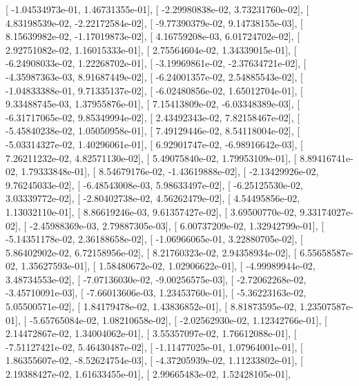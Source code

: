 \documentclass{article}
\begin{document}
       [ -1.04534973e-01,   1.46731355e-01],
       [ -2.29980838e-02,   3.73231760e-02],
       [  4.83198539e-02,  -2.22172584e-02],
       [ -9.77390379e-02,   9.14738155e-03],
       [  8.15639982e-02,  -1.17019873e-02],
       [  4.16759208e-03,   6.01724702e-02],
       [  2.92751082e-02,   1.16015333e-01],
       [  2.75564604e-02,   1.34339015e-01],
       [ -6.24908033e-02,   1.22268702e-01],
       [ -3.19969861e-02,  -2.37634721e-02],
       [ -4.35987363e-03,   8.91687449e-02],
       [ -6.24001357e-02,   2.54885543e-02],
       [ -1.04833388e-01,   9.71335137e-02],
       [ -6.02480856e-02,   1.65012704e-01],
       [  9.33488745e-03,   1.37955876e-01],
       [  7.15413809e-02,  -6.03348389e-03],
       [ -6.31717065e-02,   9.85349994e-02],
       [  2.43492343e-02,   7.82158467e-02],
       [ -5.45840238e-02,   1.05050958e-01],
       [  7.49129446e-02,   8.54118004e-02],
       [ -5.03314327e-02,   1.40296061e-01],
       [  6.92901747e-02,  -6.98916642e-03],
       [  7.26211232e-02,   4.82571130e-02],
       [  5.49075840e-02,   1.79953109e-01],
       [  8.89416741e-02,   1.79333848e-01],
       [  8.54679176e-02,  -1.43619888e-02],
       [ -2.13429926e-02,   9.76245033e-02],
       [ -6.48543008e-03,   5.98633497e-02],
       [ -6.25125530e-02,   3.03339772e-02],
       [ -2.80402738e-02,   4.56262479e-02],
       [  4.54495856e-02,   1.13032110e-01],
       [  8.86619246e-03,   9.61357427e-02],
       [  3.69500770e-02,   9.33174027e-02],
       [ -2.45988369e-03,   2.79887305e-03],
       [  6.00737209e-02,   1.32942799e-01],
       [ -5.14351178e-02,   2.36188658e-02],
       [ -1.06966065e-01,   3.22880705e-02],
       [  5.86402902e-02,   6.72158956e-02],
       [  8.21760323e-02,   2.94358934e-02],
       [  6.55658587e-02,   1.35627593e-01],
       [  1.58480672e-02,   1.02906622e-01],
       [ -4.99989944e-02,   3.48734553e-02],
       [ -7.07136030e-02,  -9.00256575e-03],
       [ -2.72062268e-02,  -3.45710091e-03],
       [ -7.66013606e-03,   1.23453760e-01],
       [ -5.36223163e-02,   5.05500571e-02],
       [  1.84179478e-02,   1.43836852e-01],
       [  8.81873595e-02,   1.23507587e-01],
       [ -5.65765084e-02,   1.08210658e-02],
       [ -2.02562930e-02,   1.12342766e-01],
       [  2.14472867e-02,   1.34004062e-01],
       [  3.55357097e-02,   1.76612088e-01],
       [ -7.51127421e-02,   5.46430487e-02],
       [ -1.11477025e-01,   1.07964001e-01],
       [  1.86355607e-02,  -8.52624754e-03],
       [ -4.37205939e-02,   1.11233802e-01],
       [  2.19388427e-02,   1.61633455e-01],
       [  2.99665483e-02,   1.52428105e-01],
\end{document}
